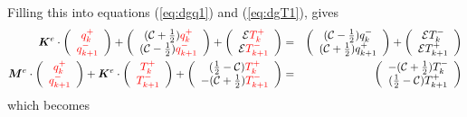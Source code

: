 Filling this into equations (\ref{eq:dgq1}) and (\ref{eq:dgT1}), gives 
\begin{eqnarray}
{\bm K}^e \cdot 
\left( 
\begin{array}{cc}
    {\color{red}q_k^+}  \\
    {\color{red}q_{k+1}^-}
\end{array}
\right)+ 
\left(
\begin{array}{cc}
     ({\cal C}+\frac{1}{2})  {\color{red}q_k^+}  \\
     ({\cal C}-\frac{1}{2})  {\color{red}q_{k+1}^-} 
\end{array}
\right)+\left(
\begin{array}{cc}
     {\cal E}    {\color{red}T_k^+}  \\
     {\cal E}    {\color{red}T_{k+1}^-} 
\end{array}
\right) 
&=& 
\left(
\begin{array}{cc}
     ({\cal C}-\frac{1}{2}) q_k^-  \\
     ({\cal C}+\frac{1}{2}) q_{k+1}^+ 
\end{array}
\right)
+ \left(
\begin{array}{cc}
     {\cal E}   T_k^-  \\
     {\cal E}   T_{k+1}^+
\end{array}
\right)  
\nonumber
\\
{\bm M}^e \cdot
\left(
\begin{array}{cc}
    {\color{red}q_k^+}  \\
    {\color{red}q_{k+1}^-}
\end{array}
\right)+
{\bm K}^e \cdot
\left(
\begin{array}{cc}
 {\color{red}T_k^+}  \\
{\color{red}T_{k+1}^-} 
\end{array}
\right) 
+ \left(
\begin{array}{cc}
     (\frac{1}{2}-{\cal C}) {\color{red}T_k^+}  \\
     -({\cal C}+\frac{1}{2}){\color{red}T_{k+1}^-} 
\end{array}
\right)
&=& \left(
\begin{array}{cc}
     -({\cal C}+\frac{1}{2})  T_k^- \\
     (\frac{1}{2}-{\cal C})  T_{k+1}^+ 
\end{array}
\right) 
\end{eqnarray}
which becomes
